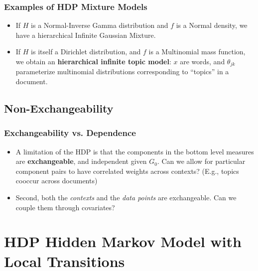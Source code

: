 \documentclass[11pt, serif, mathserif, table,trans]{beamer}
\begin{document}
\begin{frame}
  \frametitle{Examples of HDP Mixture Models}
  \begin{itemize}[<+->]
  \item If $H$ is a Normal-Inverse Gamma distribution and $f$ is a
    Normal density, we have a hierarchical Infinite Gaussian Mixture.
  \item If $H$ is itself a Dirichlet distribution, and $f$ is a
    Multinomial mass function, we obtain an {\bf
      hierarchical infinite topic model}: $x$ are words, and $\theta_{jk}$
    parameterize multinomial distributions corresponding to ``topics''
    in a document.
  \end{itemize}
\end{frame}

\subsection{Non-Exchangeability}
\label{sec:dirichl-proc-mixt}
\begin{frame}
  \frametitle{Exchangeability vs. Dependence}
  \begin{itemize}[<+->]
  \item A limitation of the HDP is that the components in the bottom
    level measures are {\bf exchangeable}, and independent given
    $G_0$.  Can we allow for particular component pairs to have
    correlated weights across contexts? (E.g., topics cooccur across documents)
  \item Second, both the {\it contexts} and the {\it data points} are
    exchangeable.  Can we couple them through covariates?
  \end{itemize}
\end{frame}



\section{HDP Hidden Markov Model with Local Transitions}
\label{sec:hdp-hidden-markov}

\end{document}
